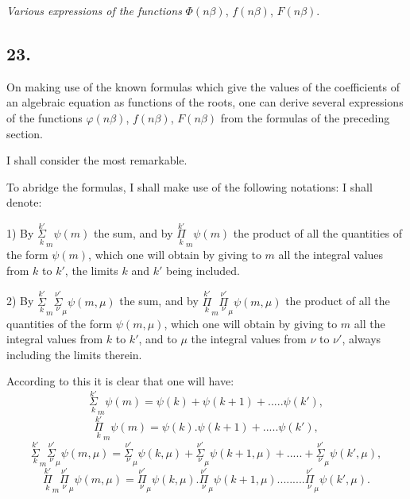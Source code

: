 \documentclass{article}
\begin{document}
\emph{Various expressions of the functions} $\Phi(n\beta)$, $f(n\beta)$, $F(n\beta)$.

\subsection*{23.}

On making use of the known formulas which give the values of the coefficients of an algebraic equation as functions of the roots, one can derive several expressions of the functions $\varphi(n\beta)$, $f(n\beta)$, $F(n\beta)$ from the formulas of the preceding section.

I shall consider the most remarkable.

To abridge the formulas, I shall make use of the following notations: I shall denote:

1) By $\overset{k'}{\underset{k}{\Sigma}}_{m}\psi(m)$ the sum, and by $\overset{k'}{\underset{k}{\Pi}}_{m}\psi(m)$ the product of all the quantities of the form $\psi(m)$, which one will obtain by giving to $m$ all the integral values from $k$ to $k'$, the limits $k$ and $k'$ being included.

2) By $\overset{k'}{\underset{k}{\Sigma}}_{m}\overset{\nu'}{\underset{\nu}{\Sigma}}_{\mu}\psi(m,\mu)$ the sum, and by $\overset{k'}{\underset{k}{\Pi}}_{m}\overset{\nu'}{\underset{\nu}{\Pi}}_{\mu}\psi(m,\mu)$ the product of all the quantities of the form $\psi(m,\mu)$, which one will obtain by giving to $m$ all the integral values from $k$ to $k'$, and to $\mu$ the integral values from $\nu$ to $\nu'$, always including the limits therein.

According to this it is clear that one will have:
\[ \overset{k'}{\underset{k}{\Sigma}}_{m}\psi(m)=\psi(k)+\psi(k+1)+.....\psi(k'), \tag{119.} \]
\[ \overset{k'}{\underset{k}{\Pi}}_{m}\psi(m)=\psi(k).\psi(k+1)+.....\psi(k'), \tag{120.} \]
\[ \overset{k'}{\underset{k}{\Sigma}}_{m}\overset{\nu'}{\underset{\nu}{\Sigma}}_{\mu}\psi(m,\mu)=\overset{\nu'}{\underset{\nu}{\Sigma}}_{\mu}\psi(k,\mu)+\overset{\nu'}{\underset{\nu}{\Sigma}}_{\mu}\psi(k+1,\mu)+.....+\overset{\nu'}{\underset{\nu}{\Sigma}}_{\mu}\psi(k',\mu), \tag{121.} \]
\[ \overset{k'}{\underset{k}{\Pi}}_{m}\overset{\nu'}{\underset{\nu}{\Pi}}_{\mu}\psi(m,\mu)=\overset{\nu'}{\underset{\nu}{\Pi}}_{\mu}\psi(k,\mu).\overset{\nu'}{\underset{\nu}{\Pi}}_{\mu}\psi(k+1,\mu).........\overset{\nu'}{\underset{\nu}{\Pi}}_{\mu}\psi(k',\mu). \tag{122.} \]
\end{document}
